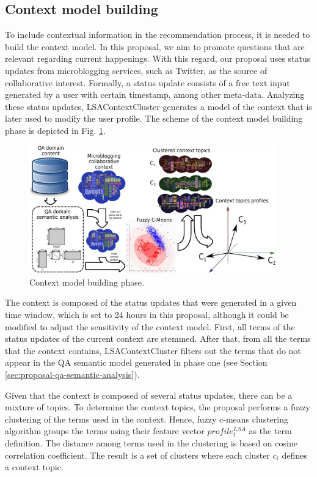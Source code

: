 \documentclass[preprint]{elsarticle}
\begin{document}
\begin{spacing}{1.5}
\subsection{Context model building}

To include contextual information in the recommendation process, it is needed to build the context model. In this proposal, we aim to promote questions that are relevant regarding current happenings. With this regard, our proposal uses status updates from microblogging services, such as Twitter, as the source of collaborative interest. Formally, a status update consists of a free text input generated by a user with certain timestamp, among other meta-data. Analyzing these status updates, LSAContextCluster generates a model of the context that is later used to modify the user profile. The scheme of the context model building phase is depicted in Fig. \ref{fig:proposal-context-clustering-phase}.

\begin{figure}[h]
	\centering
	\includegraphics[width=0.95\textwidth]{figures/clustering-phase.eps}
	\caption{Context model building phase.}
	\label{fig:proposal-context-clustering-phase}
\end{figure}

The context is composed of the status updates that were generated in a given time window, which is set to 24 hours in this proposal, although it could be modified to adjust the sensitivity of the context model. First, all terms of the status updates of the current context are stemmed. After that, from all the terms that the context contains, LSAContextCluster filters out the terms that do not appear in the QA semantic model generated in phase one (see Section \ref{sec:proposal-qa-semantic-analysis}).

Given that the context is composed of several status updates, there can be a mixture of topics. To determine the context topics, the proposal performs a fuzzy clustering of the terms used in the context. Hence, fuzzy c-means clustering algorithm \cite{Bezdek1984} groups the terms using their feature vector $profile^{LSA}_t$ as the term definition. The distance among terms used in the clustering is based on cosine correlation coefficient. The result is a set of clusters where each cluster  $c_i$ defines a context topic.


\end{spacing}
\end{document}
